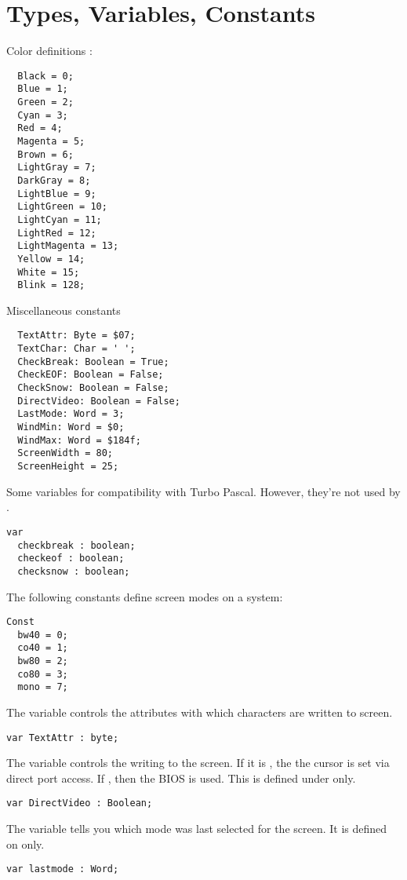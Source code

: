 \section{Types, Variables, Constants}
Color definitions :
\begin{verbatim}
  Black = 0;
  Blue = 1;
  Green = 2;
  Cyan = 3;
  Red = 4;
  Magenta = 5;
  Brown = 6;
  LightGray = 7;
  DarkGray = 8;
  LightBlue = 9;
  LightGreen = 10;
  LightCyan = 11;
  LightRed = 12;
  LightMagenta = 13;
  Yellow = 14;
  White = 15;
  Blink = 128;
\end{verbatim}
Miscellaneous constants
\begin{verbatim}
  TextAttr: Byte = $07;
  TextChar: Char = ' ';
  CheckBreak: Boolean = True;
  CheckEOF: Boolean = False;
  CheckSnow: Boolean = False;
  DirectVideo: Boolean = False;
  LastMode: Word = 3;
  WindMin: Word = $0;
  WindMax: Word = $184f;
  ScreenWidth = 80;
  ScreenHeight = 25;
\end{verbatim}
Some variables for compatibility with Turbo Pascal. However, they're not
used by \fpc.
\begin{verbatim}
var
  checkbreak : boolean;
  checkeof : boolean;
  checksnow : boolean;
\end{verbatim}
The following constants define screen modes on a \dos system:
\begin{verbatim}
Const
  bw40 = 0;
  co40 = 1;
  bw80 = 2;
  co80 = 3;
  mono = 7;
\end{verbatim}
The  variable controls the attributes with which characters
are written to screen.
\begin{verbatim}
var TextAttr : byte;
\end{verbatim}
The  variable controls the writing to the screen. If it is
, the the cursor is set via direct port access. If ,
then the BIOS is used. This is defined under \dos only.
\begin{verbatim}
var DirectVideo : Boolean;
\end{verbatim}
The  variable tells you which mode was last selected for the
screen. It is defined on \dos only.
\begin{verbatim}
var lastmode : Word;
\end{verbatim}
